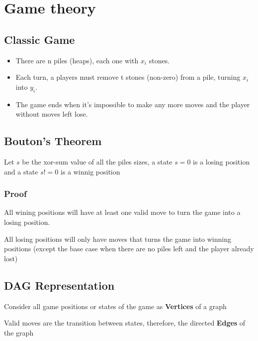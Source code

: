 \chapter{Game theory}

\section{Classic Game}

\begin{itemize}

\item There are n piles (heaps), each one with $x_i$ stones.

\item  Each turn, a players must remove t stones (non-zero) from a pile, turning $x_i$ into $y_i$.

\item The game ends when it's impossible to make any more moves and the player without moves left lose.

\end{itemize}

\section{Bouton's Theorem}

Let $s$ be the xor-sum value of all the piles sizes, 
a state $s=0$ is a losing position and a state $s!=0$ is a winnig position

\subsection{Proof}

All wining positions will have at least one valid move to turn the game into a losing position.

All losing positions will only have moves that turns the game into winning positions
(except the base case when there are no piles left and the player already lost)

\section{DAG Representation}

Consider all game positions or states of the game as \textbf{Vertices} of a graph

Valid moves are the transition between states, therefore, the directed \textbf{Edges} of the graph

